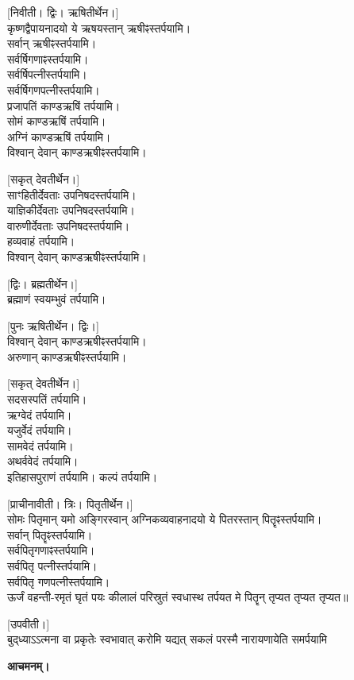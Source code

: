 {\scriptsize [निवीती। द्विः। ऋषितीर्थेन।]}\\
कृष्णद्वैपायनादयो ये ऋषयस्तान् ऋषीꣴस्तर्पयामि।\\
सर्वान् ऋषीꣴस्तर्पयामि।\\
सर्वर्षिगणाꣴस्तर्पयामि।\\
सर्वर्षिपत्नीस्तर्पयामि।\\
सर्वर्षिगणपत्नीस्तर्पयामि।\\
प्रजापतिं काण्डऋषिं तर्पयामि।\\
सोमं काण्डऋषिं तर्पयामि।\\
अग्निं काण्डऋषिं तर्पयामि।\\
विश्वान् देवान् काण्डऋषीꣴस्तर्पयामि।
\pagebreak[4]

{\scriptsize [सकृत् देवतीर्थेन।]}\\
साꣳहितीर्देवताः उपनिषदस्तर्पयामि।\\
याज्ञिकीर्देवताः उपनिषदस्तर्पयामि।\\
वारुणीर्देवताः उपनिषदस्तर्पयामि।\\
हव्यवाहं तर्पयामि।\\
विश्वान् देवान् काण्डऋषीꣴस्तर्पयामि।

{\scriptsize [द्विः। ब्रह्मतीर्थेन।]}\\
ब्रह्माणं स्वयम्भुवं तर्पयामि।

{\scriptsize [पुनः ऋषितीर्थेन। द्विः।]}\\
विश्वान् देवान् काण्डऋषीꣴस्तर्पयामि।\\
अरुणान् काण्डऋषीꣴस्तर्पयामि।

{\scriptsize [सकृत् देवतीर्थेन।]}\\
सदसस्पतिं तर्पयामि।\\
ऋग्वेदं तर्पयामि।\\
यजुर्वेदं तर्पयामि।\\
सामवेदं तर्पयामि।\\
अथर्ववेदं तर्पयामि।\\
इतिहासपुराणं तर्पयामि। कल्पं तर्पयामि।

{\scriptsize [प्राचीनावीती। त्रिः। पितृतीर्थेन।]}\\
सोमः पितृमान् यमो अङ्गिरस्वान् अग्निकव्यवाहनादयो ये पितरस्तान् पितॄꣴस्तर्पयामि।\\
सर्वान् पितॄꣴस्तर्पयामि।\\
सर्वपितृगणाꣴस्तर्पयामि।\\
सर्वपितृ पत्नीस्तर्पयामि।\\
सर्वपितृ गणपत्नीस्तर्पयामि।\\
ऊर्जं वहन्ती-रमृतं घृतं पयः कीलालं परिस्रुतं स्वधास्थ तर्पयत मे पितॄन् तृप्यत तृप्यत तृप्यत॥

{\scriptsize [उपवीती।]}\\
\vspace{-3ex}
{बुद्‌ध्याऽऽत्मना वा प्रकृतेः स्वभावात्}
{करोमि यद्यत् सकलं परस्मै}
{नारायणायेति समर्पयामि}

\textbf{आचमनम्।}

